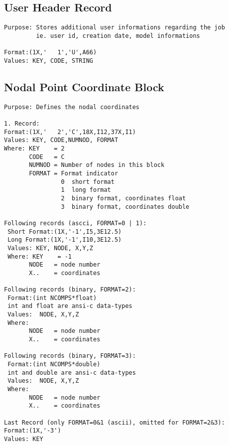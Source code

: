 \documentclass{article}
\begin{document}
\subsection{\label{User Header Record}User Header Record}
\begin{verbatim}
Purpose: Stores additional user informations regarding the job
         ie. user id, creation date, model informations

Format:(1X,'   1','U',A66)  
Values: KEY, CODE, STRING
\end{verbatim}

\subsection{\label{Nodal Point Coordinate Block}Nodal Point Coordinate Block}
\begin{verbatim}
Purpose: Defines the nodal coordinates

1. Record:
Format:(1X,'   2','C',18X,I12,37X,I1)
Values: KEY, CODE,NUMNOD, FORMAT
Where: KEY    = 2
       CODE   = C
       NUMNOD = Number of nodes in this block
       FORMAT = Format indicator
                0  short format
                1  long format 
                2  binary format, coordinates float 
                3  binary format, coordinates double 

Following records (ascci, FORMAT=0 | 1):
 Short Format:(1X,'-1',I5,3E12.5)
 Long Format:(1X,'-1',I10,3E12.5)
 Values: KEY, NODE, X,Y,Z
 Where: KEY    = -1
       NODE   = node number
       X..    = coordinates

Following records (binary, FORMAT=2):
 Format:(int NCOMPS*float)
 int and float are ansi-c data-types
 Values:  NODE, X,Y,Z
 Where: 
       NODE   = node number
       X..    = coordinates

Following records (binary, FORMAT=3):
 Format:(int NCOMPS*double)
 int and double are ansi-c data-types
 Values:  NODE, X,Y,Z
 Where: 
       NODE   = node number
       X..    = coordinates
  
Last Record (only FORMAT=0&1 (ascii), omitted for FORMAT=2&3):
Format:(1X,'-3')
Values: KEY
\end{verbatim}
\end{document}
